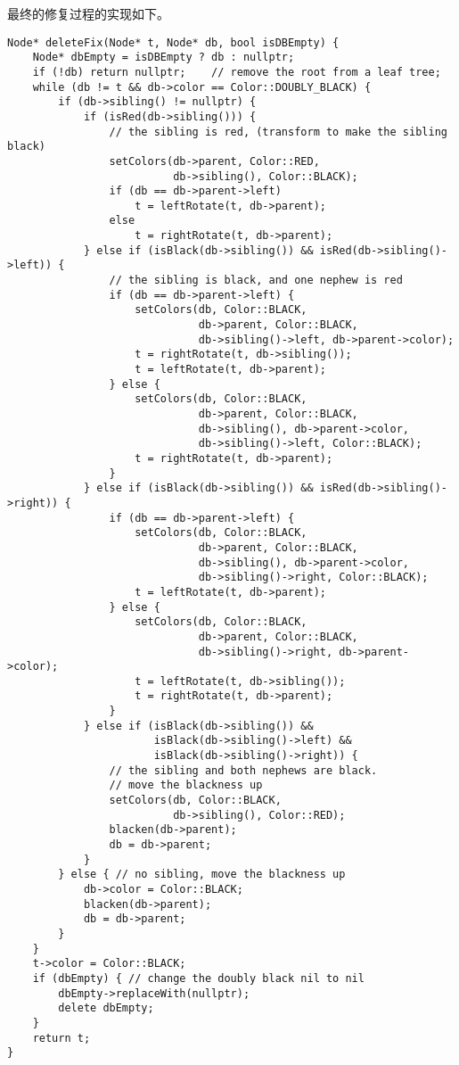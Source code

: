 \documentclass{ctexart}
\begin{document}
最终的修复过程的实现如下。

\begin{lstlisting}
Node* deleteFix(Node* t, Node* db, bool isDBEmpty) {
    Node* dbEmpty = isDBEmpty ? db : nullptr;
    if (!db) return nullptr;    // remove the root from a leaf tree;
    while (db != t && db->color == Color::DOUBLY_BLACK) {
        if (db->sibling() != nullptr) {
            if (isRed(db->sibling())) {
                // the sibling is red, (transform to make the sibling black)
                setColors(db->parent, Color::RED,
                          db->sibling(), Color::BLACK);
                if (db == db->parent->left)
                    t = leftRotate(t, db->parent);
                else
                    t = rightRotate(t, db->parent);
            } else if (isBlack(db->sibling()) && isRed(db->sibling()->left)) {
                // the sibling is black, and one nephew is red
                if (db == db->parent->left) {
                    setColors(db, Color::BLACK,
                              db->parent, Color::BLACK,
                              db->sibling()->left, db->parent->color);
                    t = rightRotate(t, db->sibling());
                    t = leftRotate(t, db->parent);
                } else {
                    setColors(db, Color::BLACK,
                              db->parent, Color::BLACK,
                              db->sibling(), db->parent->color,
                              db->sibling()->left, Color::BLACK);
                    t = rightRotate(t, db->parent);
                }
            } else if (isBlack(db->sibling()) && isRed(db->sibling()->right)) {
                if (db == db->parent->left) {
                    setColors(db, Color::BLACK,
                              db->parent, Color::BLACK,
                              db->sibling(), db->parent->color,
                              db->sibling()->right, Color::BLACK);
                    t = leftRotate(t, db->parent);
                } else {
                    setColors(db, Color::BLACK,
                              db->parent, Color::BLACK,
                              db->sibling()->right, db->parent->color);
                    t = leftRotate(t, db->sibling());
                    t = rightRotate(t, db->parent);
                }
            } else if (isBlack(db->sibling()) &&
                       isBlack(db->sibling()->left) &&
                       isBlack(db->sibling()->right)) {
                // the sibling and both nephews are black.
                // move the blackness up
                setColors(db, Color::BLACK,
                          db->sibling(), Color::RED);
                blacken(db->parent);
                db = db->parent;
            }
        } else { // no sibling, move the blackness up
            db->color = Color::BLACK;
            blacken(db->parent);
            db = db->parent;
        }
    }
    t->color = Color::BLACK;
    if (dbEmpty) { // change the doubly black nil to nil
        dbEmpty->replaceWith(nullptr);
        delete dbEmpty;
    }
    return t;
}
\end{lstlisting}
\end{document}
